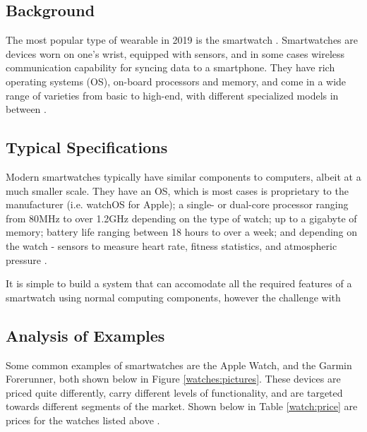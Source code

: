 \subsection{Background}
The most popular type of wearable in 2019 is the smartwatch \cite{best_watches}. 
Smartwatches are devices worn on one's wrist, equipped with sensors, and in some 
cases wireless communication capability for syncing data to a smartphone. They have
rich operating systems (OS), on-board processors and memory, and come in a wide range
of varieties from basic to high-end, with different specialized models in between \cite{smartwatch_arch_rit}.

\subsection{Typical Specifications}
Modern smartwatches typically have similar components to computers, albeit at a much smaller scale.
They have an OS, which is most cases is proprietary to the manufacturer (i.e. watchOS for Apple);
a single- or dual-core processor ranging from 80MHz to over 1.2GHz depending on the type of watch;
up to a gigabyte of memory; battery life ranging between 18 hours to over a week; and depending on 
the watch - sensors to measure heart rate, fitness statistics, 
and atmospheric pressure \cite{smartwatch_arch_rit}.

It is simple to build a system that can accomodate all the required features of a smartwatch
using normal computing components, however the challenge with 



\subsection{Analysis of Examples}
Some common examples of smartwatches are the Apple Watch,
and the Garmin Forerunner, both shown below in Figure \ref{watches:pictures}.
These devices are priced quite differently, carry different levels of functionality, and are
targeted towards different segments of the market. Shown below in Table \ref{watch:price} are 
prices for the watches listed above \cite{apple_price} \cite{garmin_price}.


